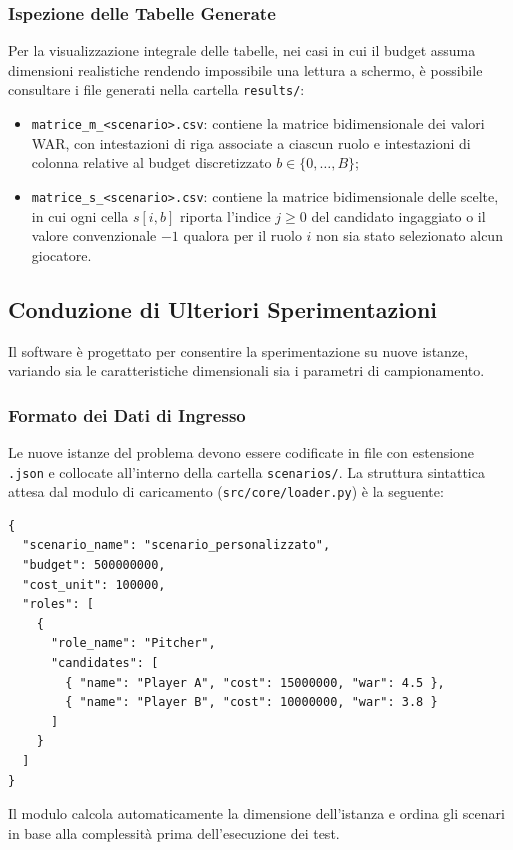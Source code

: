 \subsubsection{Ispezione delle Tabelle Generate}
Per la visualizzazione integrale delle tabelle, nei casi in cui il budget assuma dimensioni realistiche rendendo impossibile una lettura a schermo, è possibile consultare i file generati nella cartella \texttt{results/}:
\begin{itemize}
	\item \texttt{matrice\_m\_<scenario>.csv}: contiene la matrice bidimensionale dei valori WAR, con intestazioni di riga associate a ciascun ruolo e intestazioni di colonna relative al budget discretizzato $b \in \{0, \dots, B\}$;
	\item \texttt{matrice\_s\_<scenario>.csv}: contiene la matrice bidimensionale delle scelte, in cui ogni cella $s[i, b]$ riporta l'indice $j \ge 0$ del candidato ingaggiato o il valore convenzionale $-1$ qualora per il ruolo $i$ non sia stato selezionato alcun giocatore.
\end{itemize}

\subsection{Conduzione di Ulteriori Sperimentazioni}
Il software è progettato per consentire la sperimentazione su nuove istanze, variando sia le caratteristiche dimensionali sia i parametri di campionamento.

\subsubsection{Formato dei Dati di Ingresso}
Le nuove istanze del problema devono essere codificate in file con estensione \texttt{.json} e collocate all'interno della cartella \texttt{scenarios/}. La struttura sintattica attesa dal modulo di caricamento (\texttt{src/core/loader.py}) è la seguente:

\noindent\begin{minipage}{\linewidth}
\begin{verbatim}
{
  "scenario_name": "scenario_personalizzato",
  "budget": 500000000,
  "cost_unit": 100000,
  "roles": [
    {
      "role_name": "Pitcher",
      "candidates": [
        { "name": "Player A", "cost": 15000000, "war": 4.5 },
        { "name": "Player B", "cost": 10000000, "war": 3.8 }
      ]
    }
  ]
}
\end{verbatim}
\end{minipage}
Il modulo calcola automaticamente la dimensione dell'istanza e ordina gli scenari in base alla complessità prima dell'esecuzione dei test.

